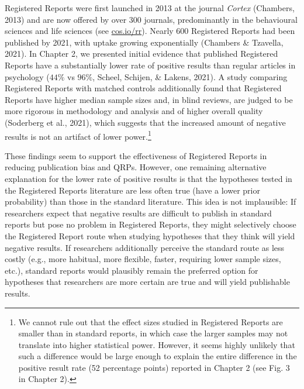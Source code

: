\documentclass[
  ,man,mask,floatsintext]{apa6}
\begin{document}
Registered Reports were first launched in 2013 at the journal \emph{Cortex} (Chambers, 2013) and are now offered by over 300 journals, predominantly in the behavioural sciences and life sciences (see \url{cos.io/rr}).
Nearly 600 Registered Reports had been published by 2021, with uptake growing exponentially (Chambers \& Tzavella, 2021).
In Chapter 2, we presented initial evidence that published Registered Reports have a substantially lower rate of positive results than regular articles in psychology (\(44\%\) vs \(96\%\), Scheel, Schijen, \& Lakens, 2021).
A study comparing Registered Reports with matched controls additionally found that Registered Reports have higher median sample sizes and, in blind reviews, are judged to be more rigorous in methodology and analysis and of higher overall quality (Soderberg et al., 2021), which suggests that the increased amount of negative results is not an artifact of lower power.\footnote{We cannot rule out that the effect sizes studied in Registered Reports are smaller than in standard reports, in which case the larger samples may not translate into higher statistical power. However, it seems highly unlikely that such a difference would be large enough to explain the entire difference in the positive result rate (52 percentage points) reported in Chapter 2 (see Fig. 3 in Chapter 2).}

These findings seem to support the effectiveness of Registered Reports in reducing publication bias and QRPs.
However, one remaining alternative explanation for the lower rate of positive results is that
the hypotheses tested in the Registered Reports literature
are less often true (have a lower prior probability)
than those in the standard literature.
This idea is not implausible:
If researchers expect that negative results are difficult to publish in standard reports but pose no problem in Registered Reports, they might selectively choose the Registered Report route when studying hypotheses that they think
will yield negative results.
If researchers additionally perceive the standard route as less costly (e.g., more habitual, more flexible, faster, requiring lower sample sizes, etc.), standard reports would plausibly remain the preferred option for hypotheses that researchers are more certain are true and will yield publishable results.
\end{document}
